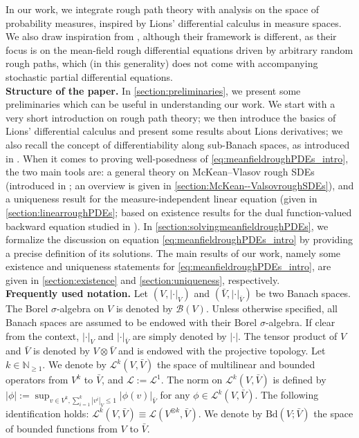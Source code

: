\documentclass[10pt, a4paper]{article} %
\theoremstyle{definition}
\theoremstyle{plain}
\begin{document}
In our work, we integrate rough path theory with analysis on the space of probability measures, inspired by Lions' differential calculus in measure spaces. We also draw inspiration from \cite{BCD19}, although their framework is different, as their focus is on the mean-field rough differential equations driven by arbitrary random rough paths, which (in this generality) does not come with accompanying stochastic partial differential equations.  %
\\


\textbf{Structure of the paper. } In \cref{section:preliminaries}, we present some preliminaries which can be useful in understanding our work. 
We start with a very short introduction on rough path theory;
we then introduce the basics of Lions' differential calculus and present some results about Lions derivatives; we also recall the concept of differentiability along sub-Banach spaces, as introduced in \cite{FHL25}. 
When it comes to proving well-posedness of \eqref{eq:meanfieldroughPDEs_intro}, the two main tools are: a general theory on McKean--Vlasov rough SDEs (introduced in \cite{FHL25}; an overview is given in \cref{section:McKean--ValsovroughSDEs}), and a uniqueness result for the measure-independent linear equation (given in \cref{section:linearroughPDEs}; based on existence results for the dual function-valued backward equation studied in \cite{BFS24}).
In \cref{section:solvingmeanfieldroughPDEs}, we formalize the discussion on equation \eqref{eq:meanfieldroughPDEs_intro} by providing a precise definition of its solutions. 
The main results of our work, namely some existence and uniqueness statements for \eqref{eq:meanfieldroughPDEs_intro}, are given in \cref{section:existence} and \cref{section:uniqueness}, respectively. \\


\textbf{Frequently used notation. } Let $(V,|\cdot|_V)$ and $(\bar V,|\cdot|_{\bar V})$ be two Banach spaces. 
The Borel $\sigma$-algebra on $V$ is denoted by $\mathcal{B}(V)$. Unless otherwise specified, all Banach spaces are assumed to be endowed with their Borel $\sigma$-algebra.
If clear from the context, $|\cdot|_V$ and $|\cdot|_{\bar V}$ are simply denoted by $|\cdot|$. 
The tensor product of $V$ and $\bar V$ is denoted by $V \otimes \bar V$ {and is endowed with the projective topology}. 
Let $k \in \mathbb{N}_{\ge 1}$.
We denote by $\mathscr{L}^k(V,\bar V)$ the space of multilinear and bounded operators from $V^k$ to $\bar V$, and $\mathscr{L}:=\mathscr{L}^1$.
The norm on $\mathscr{L}^k(V,\bar V)$ is defined by $|\phi| := \sup_{v \in V^k, \sum_{i=1}^k|v^i|_V \le 1} |\phi(v)|_{\bar V}$ for any $\phi \in \mathscr{L}^k(V,\bar V)$.
The following identification holds: $\mathscr{L}^k(V,\bar V) \equiv \mathscr{L}(V^{\otimes k},\bar V)$. We denote by $\mathrm{Bd}(V;\bar V)$ the space of bounded functions from $V$ to $\bar V$. 
\end{document}
